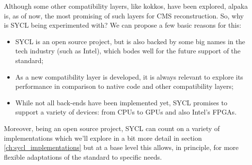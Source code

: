 Although some other compatibility layers, like kokkos, have been explored, alpaka is, as of now, the most promising of such layers for CMS reconstruction. So, why is SYCL being experimented with? We can propose a few basic reasons for this:
\begin{itemize}
    \item SYCL is an open source project, but is also backed by some big names in the tech industry (such as Intel), which bodes well for the future support of the standard;
    \item As a new compatibility layer is developed, it is always relevant to explore its performance in comparison to native code and other compatibility layers;
    \item While not all back-ends have been implemented yet, SYCL promises to support a variety of devices: from CPUs to GPUs and also Intel's FPGAs.
\end{itemize}
Moreover, being an open source project, SYCL can count on a variety of implementations which we'll explore in a bit more detail in section \ref{ch:sycl_implementations} but at a base level this allows, in principle, for more flexible adaptations of the standard to specific needs. 

